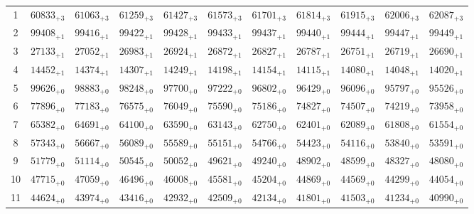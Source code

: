 \documentclass[10pt, a4paper]{article}
\begin{document}
\begin{center}
\begin{tabular}{c || c c c c c | c c c c c}
        1 & \({60833}_{+3}\) & \({61063}_{+3}\) & \({61259}_{+3}\) & \({61427}_{+3}\) & \({61573}_{+3}\) & \({61701}_{+3}\) & \({61814}_{+3}\) & \({61915}_{+3}\) & \({62006}_{+3}\) & \({62087}_{+3}\)\\
        2 & \({99408}_{+1}\) & \({99416}_{+1}\) & \({99422}_{+1}\) & \({99428}_{+1}\) & \({99433}_{+1}\) & \({99437}_{+1}\) & \({99440}_{+1}\) & \({99444}_{+1}\) & \({99447}_{+1}\) & \({99449}_{+1}\)\\
        3 & \({27133}_{+1}\) & \({27052}_{+1}\) & \({26983}_{+1}\) & \({26924}_{+1}\) & \({26872}_{+1}\) & \({26827}_{+1}\) & \({26787}_{+1}\) & \({26751}_{+1}\) & \({26719}_{+1}\) & \({26690}_{+1}\)\\
        4 & \({14452}_{+1}\) & \({14374}_{+1}\) & \({14307}_{+1}\) & \({14249}_{+1}\) & \({14198}_{+1}\) & \({14154}_{+1}\) & \({14115}_{+1}\) & \({14080}_{+1}\) & \({14048}_{+1}\) & \({14020}_{+1}\)\\
        5 & \({99626}_{+0}\) & \({98883}_{+0}\) & \({98248}_{+0}\) & \({97700}_{+0}\) & \({97222}_{+0}\) & \({96802}_{+0}\) & \({96429}_{+0}\) & \({96096}_{+0}\) & \({95797}_{+0}\) & \({95526}_{+0}\)\\
        \hline
        6 & \({77896}_{+0}\) & \({77183}_{+0}\) & \({76575}_{+0}\) & \({76049}_{+0}\) & \({75590}_{+0}\) & \({75186}_{+0}\) & \({74827}_{+0}\) & \({74507}_{+0}\) & \({74219}_{+0}\) & \({73958}_{+0}\)\\
        7 & \({65382}_{+0}\) & \({64691}_{+0}\) & \({64100}_{+0}\) & \({63590}_{+0}\) & \({63143}_{+0}\) & \({62750}_{+0}\) & \({62401}_{+0}\) & \({62089}_{+0}\) & \({61808}_{+0}\) & \({61554}_{+0}\)\\
        8 & \({57343}_{+0}\) & \({56667}_{+0}\) & \({56089}_{+0}\) & \({55589}_{+0}\) & \({55151}_{+0}\) & \({54766}_{+0}\) & \({54423}_{+0}\) & \({54116}_{+0}\) & \({53840}_{+0}\) & \({53591}_{+0}\)\\
        9 & \({51779}_{+0}\) & \({51114}_{+0}\) & \({50545}_{+0}\) & \({50052}_{+0}\) & \({49621}_{+0}\) & \({49240}_{+0}\) & \({48902}_{+0}\) & \({48599}_{+0}\) & \({48327}_{+0}\) & \({48080}_{+0}\)\\
        10 & \({47715}_{+0}\) & \({47059}_{+0}\) & \({46496}_{+0}\) & \({46008}_{+0}\) & \({45581}_{+0}\) & \({45204}_{+0}\) & \({44869}_{+0}\) & \({44569}_{+0}\) & \({44299}_{+0}\) & \({44054}_{+0}\)\\
        \hline
        11 & \({44624}_{+0}\) & \({43974}_{+0}\) & \({43416}_{+0}\) & \({42932}_{+0}\) & \({42509}_{+0}\) & \({42134}_{+0}\) & \({41801}_{+0}\) & \({41503}_{+0}\) & \({41234}_{+0}\) & \({40990}_{+0}\)\\

\end{tabular}
\end{center}
\end{document}
